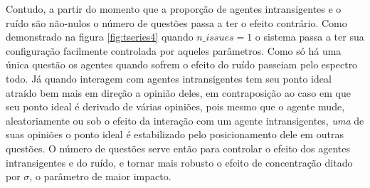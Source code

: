   Contudo, a partir do momento que a proporção de agentes intransigentes e o
  ruído são não-nulos o número de questões passa a ter o efeito contrário. Como
  demonstrado na figura \ref{fig:tseries4} quando \(n\_issues = 1\) o sistema
  passa a ter sua configuração facilmente controlada por aqueles parâmetros.
  Como só há uma única questão os agentes quando sofrem o efeito do ruído
  passeiam pelo espectro todo. Já quando interagem com agentes intransigentes
  tem seu ponto ideal atraído bem mais em direção a opinião deles, em
  contraposição ao caso em que seu ponto ideal é derivado de várias opiniões,
  pois mesmo que o agente mude, aleatoriamente ou sob o efeito da interação com
  um agente intransigentes, \textit{uma} de suas opiniões o ponto ideal é
  estabilizado pelo posicionamento dele em outras questões. O número de questões
  serve então para controlar o efeito dos agentes intransigentes e do ruído, e
  tornar mais robusto o efeito de concentração ditado por \(\sigma\), o parâmetro de
  maior impacto.



